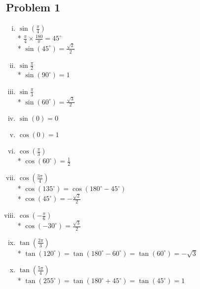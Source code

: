 \documentclass[a4paper]{article}
\begin{document}
  \subsection*{Problem 1}
  \begin{enumerate}[i.]
    \item $\sin (\frac{\pi}{4}) $\\*
    $\frac{\pi}{4} \times \frac{180}{\pi} = 45^{\circ}$\\*
    $\sin(45^{\circ}) = \frac{\sqrt{2}}{2}$
    
    \item $\sin \frac{\pi}{2} $\\*
    $\sin(90^{\circ}) = 1$
    
    \item $\sin \frac{\pi}{3}$\\*
    $\sin(60^{\circ}) = \frac{\sqrt{3}}{2}$
    
    \item $\sin(0) = 0$
    
    \item $\cos(0) = 1$
    
    \item $\cos(\frac{\pi}{3})$\\* 
    $\cos(60^{\circ}) = \frac{1}{2}$
    
    \item $\cos(\frac{3 \pi}{4})$\\*
    $\cos(135^{\circ}) = \cos(180^{\circ} - 45^{\circ})$\\*
    $\cos(45^{\circ}) = -\frac{\sqrt{2}}{2}$
    
    \item $\cos(-\frac{\pi}{6})$\\*
    $\cos(-30^{\circ}) = \frac{\sqrt{3}}{2}$

    \item $\tan(\frac{2 \pi}{3})$\\*
    $\tan(120^{\circ}) = \tan(180^{\circ} - 60^{\circ}) = \tan(60^{\circ}) = - \sqrt{3}$

    \item $\tan(\frac{5 \pi}{4})$\\*
    $\tan(255^{\circ}) = \tan(180^{\circ} + 45^{\circ}) = \tan(45^{\circ}) = 1 $
  \end{enumerate}
\end{document}
